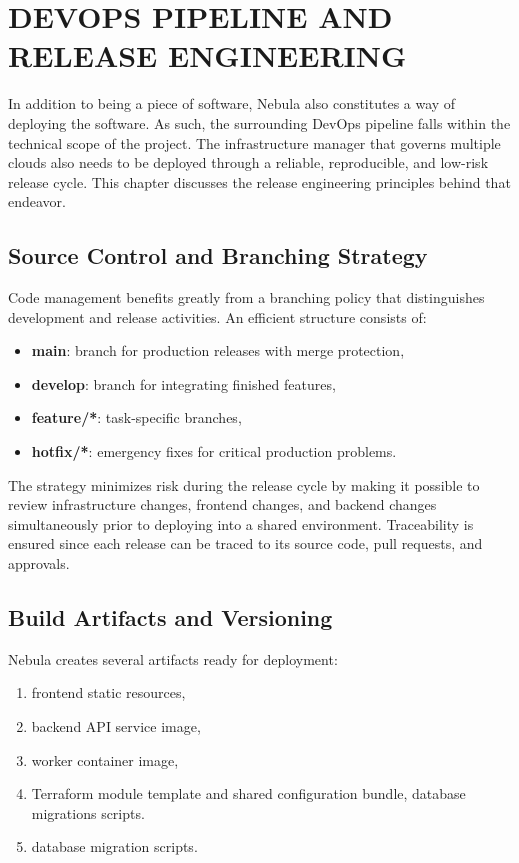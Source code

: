 \chapter{DEVOPS PIPELINE AND RELEASE ENGINEERING}
\thispagestyle{plain}

In addition to being a piece of software, Nebula also constitutes a way of deploying the software. As such, the surrounding DevOps pipeline falls within the technical scope of the project. The infrastructure manager that governs multiple clouds also needs to be deployed through a reliable, reproducible, and low-risk release cycle. This chapter discusses the release engineering principles behind that endeavor.

\section{Source Control and Branching Strategy}
Code management benefits greatly from a branching policy that distinguishes development and release activities. An efficient structure consists of:

\begin{itemize}
    \item \textbf{main}: branch for production releases with merge protection,
    \item \textbf{develop}: branch for integrating finished features,
    \item \textbf{feature/*}: task-specific branches,
    \item \textbf{hotfix/*}: emergency fixes for critical production problems.
\end{itemize}


The strategy minimizes risk during the release cycle by making it possible to review infrastructure changes, frontend changes, and backend changes simultaneously prior to deploying into a shared environment. Traceability is ensured since each release can be traced to its source code, pull requests, and approvals.

\section{Build Artifacts and Versioning}
Nebula creates several artifacts ready for deployment:

\begin{enumerate}
    \item frontend static resources,
    \item backend API service image,
    \item worker container image,
    \item Terraform module template and shared configuration bundle, 
    \items database migrations scripts.
    \item database migration scripts.
\end{enumerate}

